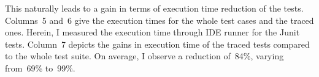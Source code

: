This naturally leads to a gain in terms of execution time reduction of the tests. 
Columns~5 and~6 give the execution times for the whole test cases and the traced ones. Herein, I measured the execution time through IDE runner for the Junit tests.
Column~7 depicts the gains in execution time of the traced tests compared to the whole test suite. On average, I observe a reduction of~84\%, varying from~69\% to~99\%. 


